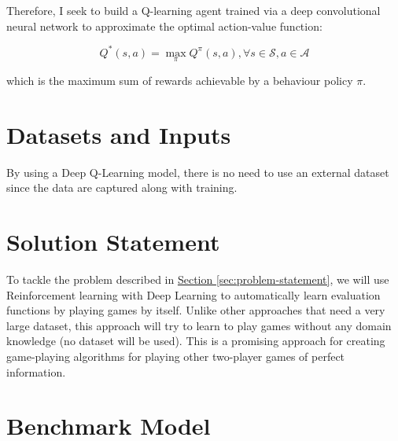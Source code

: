 \documentclass{article}
\begin{document}
Therefore, I seek to build a Q-learning agent trained via a deep convolutional neural network to
approximate the optimal action-value function:

\begin{equation}
Q^*(s,a) = \max\limits_\pi Q^\pi(s,a), \forall s \in \mathcal{S}, a \in \mathcal{A}
\end{equation}

\noindent which is the maximum sum of rewards achievable by a behaviour policy $\pi$.

\section{Datasets and Inputs}

By using a Deep Q-Learning model, there is no need to use an external dataset since the data are captured along with training. 

\section{Solution Statement}

To tackle the problem described in \hyperref[sec:problem-statement]{Section
\ref*{sec:problem-statement}}, we will use Reinforcement learning with Deep Learning to
automatically learn evaluation functions by playing games by itself. Unlike other approaches
that need a very large dataset, this approach will try to learn to play games without any domain
knowledge (no dataset will be used). This is a promising approach for creating game-playing
algorithms for playing other two-player games of perfect information.

\section{Benchmark Model}
\label{sec:benchmark}
\end{document}
